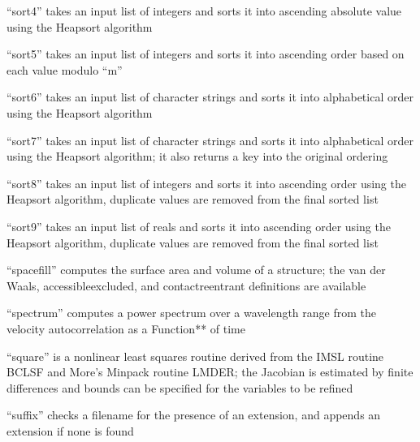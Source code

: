 \documentclass[letterpaper,11pt,english]{sphinxmanual}
\begin{document}

“sort4” takes an input list of integers and sorts it into ascending absolute value using the Heapsort algorithm


“sort5” takes an input list of integers and sorts it into ascending order based on each value modulo “m”


“sort6” takes an input list of character strings and sorts it into alphabetical order using the Heapsort algorithm


“sort7” takes an input list of character strings and sorts it into alphabetical order using the Heapsort algorithm; it also returns a key into the original ordering


“sort8” takes an input list of integers and sorts it into ascending order using the Heapsort algorithm, duplicate values are removed from the final sorted list


“sort9” takes an input list of reals and sorts it into ascending order using the Heapsort algorithm, duplicate values are removed from the final sorted list


“spacefill” computes the surface area and volume of a structure; the van der Waals, accessible\sphinxhyphen{}excluded, and contact\sphinxhyphen{}reentrant definitions are available


“spectrum” computes a power spectrum over a wavelength range from the velocity autocorrelation as a Function** of time


“square” is a nonlinear least squares routine derived from the IMSL routine BCLSF and More’s Minpack routine LMDER; the Jacobian is estimated by finite differences and bounds can be specified for the variables to be refined


“suffix” checks a filename for the presence of an extension, and appends an extension if none is found
\end{document}
